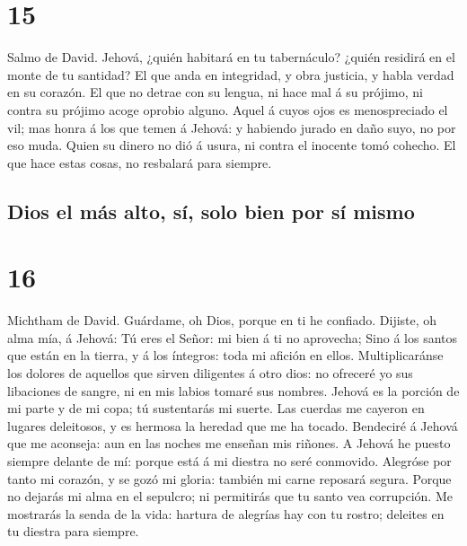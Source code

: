 \hypertarget{section-14}{%
\section{15}\label{section-14}}

 Salmo de David. Jehová, ¿quién habitará en tu
tabernáculo? ¿quién residirá en el monte de tu santidad? 
El que anda en integridad, y obra justicia, y habla verdad en su
corazón.  El que no detrae con su lengua, ni hace mal á su
prójimo, ni contra su prójimo acoge oprobio alguno.  Aquel
á cuyos ojos es menospreciado el vil; mas honra á los que temen á
Jehová: y habiendo jurado en daño suyo, no por eso muda. 
Quien su dinero no dió á usura, ni contra el inocente tomó cohecho. El
que hace estas cosas, no resbalará para siempre.

\hypertarget{dios-el-muxe1s-alto-suxed-solo-bien-por-suxed-mismo}{%
\subsection{Dios el más alto, sí, solo bien por sí
mismo}\label{dios-el-muxe1s-alto-suxed-solo-bien-por-suxed-mismo}}

\hypertarget{section-15}{%
\section{16}\label{section-15}}

 Michtham de David. Guárdame, oh Dios, porque en ti he
confiado.  Dijiste, oh alma mía, á Jehová: Tú eres el
Señor: mi bien á ti no aprovecha;  Sino á los santos que
están en la tierra, y á los íntegros: toda mi afición en ellos.
 Multiplicaránse los dolores de aquellos que sirven
diligentes á otro dios: no ofreceré yo sus libaciones de sangre, ni en
mis labios tomaré sus nombres.  Jehová es la porción de mi
parte y de mi copa; tú sustentarás mi suerte.  Las cuerdas
me cayeron en lugares deleitosos, y es hermosa la heredad que me ha
tocado.  Bendeciré á Jehová que me aconseja: aun en las
noches me enseñan mis riñones.  A Jehová he puesto siempre
delante de mí: porque está á mi diestra no seré conmovido.
 Alegróse por tanto mi corazón, y se gozó mi gloria:
también mi carne reposará segura.  Porque no dejarás mi
alma en el sepulcro; ni permitirás que tu santo vea corrupción.
 Me mostrarás la senda de la vida: hartura de alegrías
hay con tu rostro; deleites en tu diestra para siempre.

